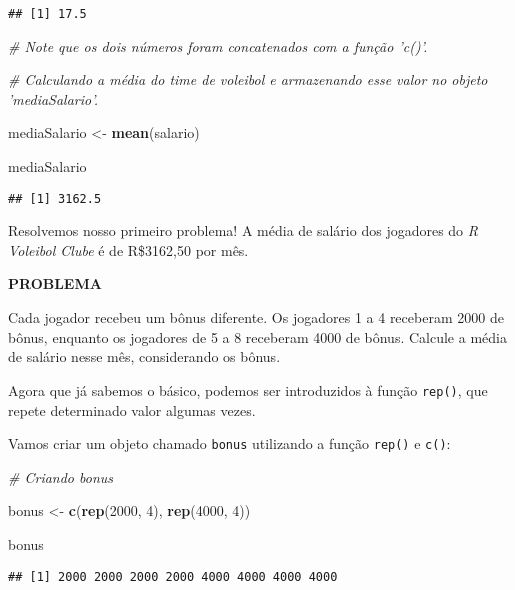 \documentclass[
]{article}
\newenvironment{Shaded}{\begin{snugshade}}{\end{snugshade}}
\newcommand{\CommentTok}[1]{\textcolor[rgb]{0.56,0.35,0.01}{\textit{#1}}}
\newcommand{\DecValTok}[1]{\textcolor[rgb]{0.00,0.00,0.81}{#1}}
\newcommand{\KeywordTok}[1]{\textcolor[rgb]{0.13,0.29,0.53}{\textbf{#1}}}
\newcommand{\NormalTok}[1]{#1}
\newcommand{\StringTok}[1]{\textcolor[rgb]{0.31,0.60,0.02}{#1}}
\begin{document}
\begin{verbatim}
## [1] 17.5
\end{verbatim}

\begin{Shaded}
\begin{Highlighting}[]
\CommentTok{# Note que os dois números foram concatenados com a função 'c()'.}

\CommentTok{# Calculando a média do time de voleibol e armazenando esse valor no objeto 'mediaSalario'.}

\NormalTok{mediaSalario <-}\StringTok{ }\KeywordTok{mean}\NormalTok{(salario)}

\NormalTok{mediaSalario}
\end{Highlighting}
\end{Shaded}

\begin{verbatim}
## [1] 3162.5
\end{verbatim}

Resolvemos nosso primeiro problema! A média de salário dos jogadores do
\emph{R Voleibol Clube} é de R\$3162,50 por mês.

\textbf{PROBLEMA}

Cada jogador recebeu um bônus diferente. Os jogadores 1 a 4 receberam
2000 de bônus, enquanto os jogadores de 5 a 8 receberam 4000 de bônus.
Calcule a média de salário nesse mês, considerando os bônus.

Agora que já sabemos o básico, podemos ser introduzidos à função
\texttt{rep()}, que repete determinado valor algumas vezes.

Vamos criar um objeto chamado \texttt{bonus} utilizando a função
\texttt{rep()} e \texttt{c()}:

\begin{Shaded}
\begin{Highlighting}[]
\CommentTok{# Criando bonus}

\NormalTok{bonus <-}\StringTok{ }\KeywordTok{c}\NormalTok{(}\KeywordTok{rep}\NormalTok{(}\DecValTok{2000}\NormalTok{, }\DecValTok{4}\NormalTok{), }\KeywordTok{rep}\NormalTok{(}\DecValTok{4000}\NormalTok{, }\DecValTok{4}\NormalTok{))}

\NormalTok{bonus}
\end{Highlighting}
\end{Shaded}

\begin{verbatim}
## [1] 2000 2000 2000 2000 4000 4000 4000 4000
\end{verbatim}
\end{document}
